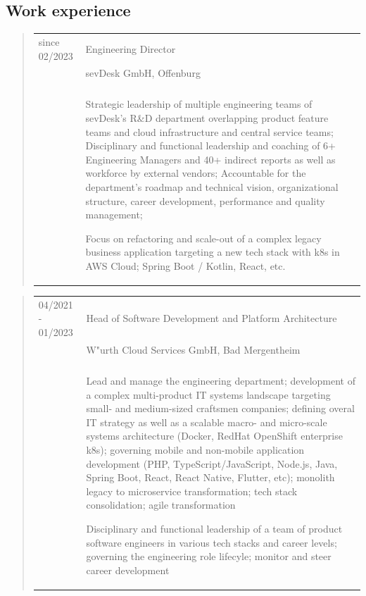 \subsection*{Work experience}
	\begin{quote}
		\begin{tabular}{p{4cm}l}
			since 02/2023&Engineering Director\\
			&sevDesk GmbH, Offenburg\\
			\\
			&\begin{minipage}{10cm}
				Strategic leadership of multiple engineering teams of sevDesk's R\&D department overlapping 
				product feature teams and cloud infrastructure and central service teams; 
				Disciplinary and functional leadership and coaching of 6+ Engineering Managers and 40+ indirect reports as well as workforce by external vendors; 
				Accountable for the department's roadmap and technical vision, organizational structure, career development, 
                			performance and quality management;\newline
                
                			Focus on refactoring and scale-out of a complex legacy business application targeting a new tech stack 
                            with k8s in AWS Cloud; Spring Boot / Kotlin, React, etc.
			\end{minipage}
		\end{tabular}
	\end{quote}
	\begin{quote}
		\begin{tabular}{p{4cm}l}
			04/2021 - 01/2023&Head of Software Development and Platform Architecture\\
			&W"urth Cloud Services GmbH, Bad Mergentheim\\
			\\
			&\begin{minipage}{10cm}
				Lead and manage the engineering department; development of a complex multi-product 
				IT systems landscape targeting small- and medium-sized craftsmen companies; defining overal IT strategy as well 
				as a scalable macro- and micro-scale systems architecture (Docker, RedHat OpenShift enterprise k8s); governing 
				mobile and non-mobile application development (PHP, TypeScript/JavaScript, Node.js, Java, Spring Boot, React, 
				React Native, Flutter, etc); monolith legacy to microservice transformation; tech stack consolidation; agile transformation\newline
				
				Disciplinary and functional leadership of a team of product software engineers in various tech stacks and 
				career levels; governing the engineering role lifecyle; monitor and steer career development
			\end{minipage}
		\end{tabular}
	\end{quote}
